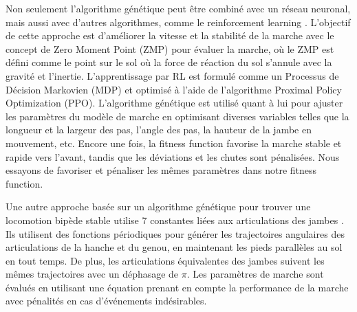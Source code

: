 \documentclass[journal, a4paper]{IEEEtran}
\begin{document}




Non seulement l'algorithme génétique peut être combiné avec un réseau neuronal, mais aussi avec d'autres algorithmes, comme le reinforcement learning \cite{6-control}. L'objectif de cette approche est d'améliorer la vitesse et la stabilité de la marche avec le concept de Zero Moment Point (ZMP) pour évaluer la marche, où le ZMP est défini comme le point sur le sol où la force de réaction du sol s'annule avec la gravité et l'inertie. L'apprentissage par RL est formulé comme un Processus de Décision Markovien (MDP) et optimisé à l'aide de l'algorithme Proximal Policy Optimization (PPO). L'algorithme génétique est utilisé quant à lui pour ajuster les paramètres du modèle de marche en optimisant diverses variables telles que la longueur et la largeur des pas, l'angle des pas, la hauteur de la jambe en mouvement, etc. Encore une fois, la fitness function favorise la marche stable et rapide vers l'avant, tandis que les déviations et les chutes sont pénalisées. Nous essayons de favoriser et pénaliser les mêmes paramètres dans notre fitness function.


Une autre approche basée sur un algorithme génétique pour trouver une locomotion bipède stable utilise 7 constantes liées aux articulations des jambes \cite{3-arms}. Ils utilisent des fonctions périodiques pour générer les trajectoires angulaires des articulations de la hanche et du genou, en maintenant les pieds parallèles au sol en tout temps. De plus, les articulations équivalentes des jambes suivent les mêmes trajectoires avec un déphasage de $π$. Les paramètres de marche sont évalués en utilisant une équation prenant en compte la performance de la marche avec pénalités en cas d'événements indésirables.
\end{document}
